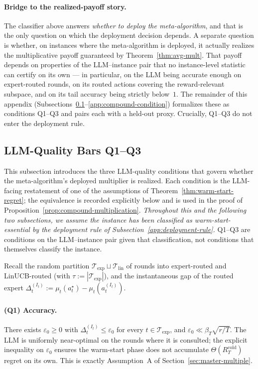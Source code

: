 \documentclass{article}
\theoremstyle{definition}
\theoremstyle{remark}
\theoremstyle{remark}
\begin{document}
\paragraph{Bridge to the realized-payoff story.}
The classifier above answers \emph{whether to deploy the meta-algorithm},
and that is the only question on which the deployment decision depends.
A separate question is whether, on instances where the meta-algorithm
is deployed, it actually realizes the multiplicative payoff guaranteed
by Theorem~\ref{thm:avg-mult}. That payoff depends on properties of
the LLM--instance pair that no instance-level statistic can certify on
its own --- in particular, on the LLM being accurate enough on
expert-routed rounds, on its routed actions covering the
reward-relevant subspace, and on its tail accuracy being strictly
below~$1$. The remainder of this appendix
(Subsections~\ref{app:llm-quality}--\ref{app:compound-condition})
formalizes these as conditions Q1--Q3 and pairs each with a held-out
proxy. Crucially, Q1--Q3 do not enter the deployment rule.

\subsection{LLM-Quality Bars Q1--Q3}
\label{app:llm-quality}

This subsection introduces the three LLM-quality conditions that
govern whether the meta-algorithm's deployed multiplier is realized.
Each condition is the LLM-facing restatement of one of the assumptions
of Theorem~\ref{thm:warm-start-regret}; the equivalence is recorded
explicitly below and is used in the proof of
Proposition~\ref{prop:compound-multiplication}.
\emph{Throughout this and the following two subsections, we assume
the instance has been classified as warm-start-essential by the
deployment rule of Subsection~\ref{app:deployment-rule}.} Q1--Q3 are
conditions on the LLM--instance pair given that classification, not
conditions that themselves classify the instance.

Recall the random partition
$\mathcal T_{\mathrm{exp}}\sqcup\mathcal T_{\mathrm{lin}}$ of rounds
into expert-routed and LinUCB-routed (with
$\tau := |\mathcal T_{\mathrm{exp}}|$), and the instantaneous
gap of the routed expert
$\Delta_t^{(I_t)} := \mu_t(a_t^\star) - \mu_t(a_t^{(I_t)})$.

\paragraph{(Q1) Accuracy.}\label{q:accuracy}
There exists $\varepsilon_0 \ge 0$ with
$\Delta_t^{(I_t)}\le\varepsilon_0$ for every $t\in\mathcal T_{\mathrm{exp}}$,
and $\varepsilon_0 \ll \beta_T\sqrt{r/T}$. The LLM is uniformly
near-optimal on the rounds where it is consulted; the explicit
inequality on $\varepsilon_0$ ensures the warm-start phase does not
accumulate $\Theta(R_T^{\mathrm{cold}})$ regret on its own.
This is exactly Assumption~A of Section~\ref{sec:master-multiple}.
\end{document}

